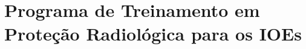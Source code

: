 \chapter{Programa de Treinamento em Proteção Radiológica para os IOEs}
\label{ch:programa_treinamento_pr}

\vfill